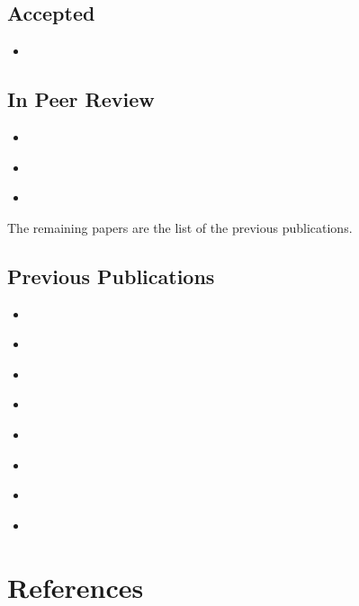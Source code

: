 \documentclass[11pt]{article}
\begin{document}
\subsection{Accepted}\label{subsec:accepted}

\begin{itemize}
	\item {}~\cite{DBLP:conf/aequitas/Magnini24}
\end{itemize}

\subsection{In Peer Review}\label{subsec:in-peer-review}

\begin{itemize}
	\item {}~\cite{DBLP:journals/kbs/CiattoKB24}
	\item {}~\cite{DBLP:conf/percom/MontagnaAFPKUM24}
	\item {}~\cite{DBLP:conf/hc/Magnini24}
\end{itemize}
%
The remaining papers are the list of the previous publications.
%
\subsection{Previous Publications}\label{subsec:previous-publications}

\begin{itemize}
	\item {}~\cite{DBLP:journals/aamas/AgiolloRMCO23}
	\item {}~\cite{DBLP:journals/cmpb/MagniniCCAO23}
	\item {}~\cite{DBLP:journals/logcom/MagniniCO23}
	\item {}~\cite{DBLP:conf/woa/MagniniCO22}
	\item {}~\cite{DBLP:conf/aiia/MagniniCO22}
	\item {}~\cite{DBLP:conf/cilc/MagniniCO22}
	\item {}~\cite{DBLP:conf/atal/MagniniCO22}
	\item {}~\cite{DBLP:conf/extraamas/CiattoMBAO23}
\end{itemize}

\section{References}\label{sec:references}
\printbibliography[heading=none]
\end{document}
